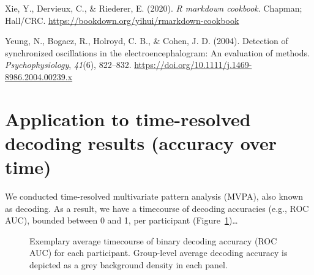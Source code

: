 \documentclass[
  doc,
  floatsintext,
  longtable,
  a4paper,
  nolmodern,
  notxfonts,
  notimes,
  colorlinks=true,linkcolor=blue,citecolor=blue,urlcolor=blue]{apa7}
\newlength{\cslhangindent}
\newenvironment{CSLReferences}[2] %
 {\begin{list}{}{%
  \setlength{\itemindent}{0pt}
  \setlength{\leftmargin}{0pt}
  \setlength{\parsep}{0pt}
  \ifodd #1
   \setlength{\leftmargin}{\cslhangindent}
   \setlength{\itemindent}{-1\cslhangindent}
  \fi
  \setlength{\itemsep}{#2\baselineskip}}}
 {\end{list}}
\begin{document}
\begin{CSLReferences}{1}{0}
Xie, Y., Dervieux, C., \& Riederer, E. (2020). \emph{R markdown
cookbook}. Chapman; Hall/CRC.
\url{https://bookdown.org/yihui/rmarkdown-cookbook}

Yeung, N., Bogacz, R., Holroyd, C. B., \& Cohen, J. D. (2004). Detection
of synchronized oscillations in the electroencephalogram: An evaluation
of methods. \emph{Psychophysiology}, \emph{41}(6), 822--832.
\url{https://doi.org/10.1111/j.1469-8986.2004.00239.x}

\end{CSLReferences}

\newpage

\appendix

\section{Application to time-resolved decoding results (accuracy over
time)}\label{application-to-time-resolved-decoding-results-accuracy-over-time}

We conducted time-resolved multivariate pattern analysis (MVPA), also
known as decoding. As a result, we have a timecourse of decoding
accuracies (e.g., ROC AUC), bounded between 0 and 1, per participant
(Figure~\ref{fig-mne-decoding})\ldots{}

\begin{figure}[!htb]

\caption{\label{fig-mne-decoding}Exemplary average timecourse of binary
decoding accuracy (ROC AUC) for each participant. Group-level average
decoding accuracy is depicted as a grey background density in each
panel.}


\end{figure}%
\end{document}
